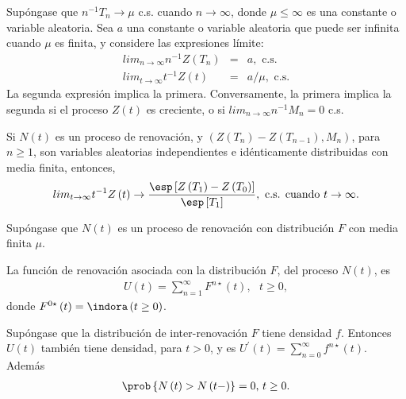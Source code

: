 \begin{Teo}
Sup\'ongase que $n^{-1}T_{n}\rightarrow\mu$ c.s. cuando $n\rightarrow\infty$, donde $\mu\leq\infty$ es una constante o variable aleatoria. Sea $a$ una constante o variable aleatoria que puede ser infinita cuando $\mu$ es finita, y considere las expresiones l\'imite:
\begin{eqnarray}
lim_{n\rightarrow\infty}n^{-1}Z\left(T_{n}\right)&=&a,\textrm{ c.s.}\\
lim_{t\rightarrow\infty}t^{-1}Z\left(t\right)&=&a/\mu,\textrm{ c.s.}
\end{eqnarray}
La segunda expresi\'on implica la primera. Conversamente, la primera implica la segunda si el proceso $Z\left(t\right)$ es creciente, o si $lim_{n\rightarrow\infty}n^{-1}M_{n}=0$ c.s.
\end{Teo}

\begin{Coro}
Si $N\left(t\right)$ es un proceso de renovaci\'on, y $\left(Z\left(T_{n}\right)-Z\left(T_{n-1}\right),M_{n}\right)$, para $n\geq1$, son variables aleatorias independientes e id\'enticamente distribuidas con media finita, entonces,
\begin{eqnarray}
lim_{t\rightarrow\infty}t^{-1}Z\left(t\right)\rightarrow\frac{\esp\left[Z\left(T_{1}\right)-Z\left(T_{0}\right)\right]}{\esp\left[T_{1}\right]},\textrm{ c.s. cuando  }t\rightarrow\infty.
\end{eqnarray}
\end{Coro}


Sup\'ongase que $N\left(t\right)$ es un proceso de renovaci\'on con distribuci\'on $F$ con media finita $\mu$.

\begin{Def}
La funci\'on de renovaci\'on asociada con la distribuci\'on $F$, del proceso $N\left(t\right)$, es
\begin{eqnarray*}
U\left(t\right)=\sum_{n=1}^{\infty}F^{n\star}\left(t\right),\textrm{   }t\geq0,
\end{eqnarray*}
donde $F^{0\star}\left(t\right)=\indora\left(t\geq0\right)$.
\end{Def}


\begin{Prop}
Sup\'ongase que la distribuci\'on de inter-renovaci\'on $F$ tiene densidad $f$. Entonces $U\left(t\right)$ tambi\'en tiene densidad, para $t>0$, y es $U^{'}\left(t\right)=\sum_{n=0}^{\infty}f^{n\star}\left(t\right)$. Adem\'as
\begin{eqnarray*}
\prob\left\{N\left(t\right)>N\left(t-\right)\right\}=0\textrm{,   }t\geq0.
\end{eqnarray*}
\end{Prop}

